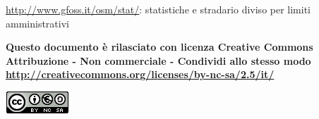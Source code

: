 \documentclass[a4paper,twoside,12pt,]{article}
\begin{document}
\url{http://www.gfoss.it/osm/stat/}: statistiche e stradario diviso per limiti amministrativi

\vfill
\begin{center}\begin{small}\textbf{
Questo documento è rilasciato con licenza 
Creative Commons Attribuzione - Non commerciale - Condividi allo stesso modo
\url{http://creativecommons.org/licenses/by-nc-sa/2.5/it/}}\end{small}\end{center}
\begin{center}
 \includegraphics{ccbysa.png}
\end{center}
\end{document}
